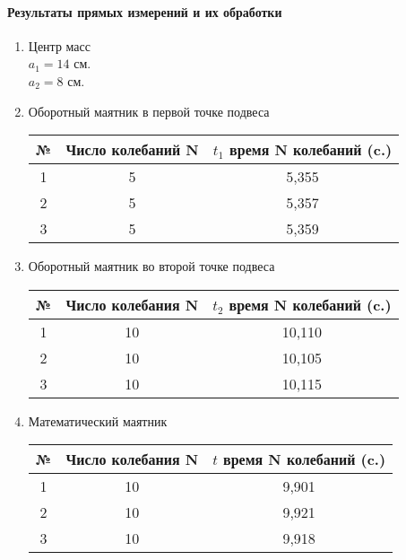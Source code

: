 \documentclass{article}
\begin{document}
\paragraph{Результаты прямых измерений и их обработки }
\begin{enumerate}
	\item Центр масс\\
	$ a_1 = 14 $ см.\\
	$ a_2 = 8$ см.
	
\item Оборотный маятник в первой точке подвеса\\
\begin{table}[!h]	
\begin{tabular}{|c|c|c|}
	\hline
	№ & Число колебаний N & $t_1$  время N колебаний (c.) \\
	\hline
	1 & 5 & 5,355 \\
	\hline
	2 & 5 & 5,357 \\
	\hline
	3 & 5 & 5,359 \\
	\hline
\end{tabular}
\end{table}

\item Оборотный маятник во второй точке подвеса

\begin{table}[!h]
\begin{tabular}{|c|c|c|}
		\hline
		№ & Число колебания N & $t_2$  время N колебаний (c.) \\
		\hline
		1 & 10 & 10,110 \\
		\hline
		2 & 10 & 10,105 \\
		\hline
		3 & 10 & 10,115 \\
		\hline
\end{tabular}
\end{table}

\item Математический маятник

\begin{table}[!hpb]
	\begin{tabular}{|c|c|c|}
		\hline
		№ & Число колебания N & $t$  время N колебаний (c.) \\
		\hline
		1 & 10 &  9,901\\
		\hline
		2 & 10 & 9,921 \\
		\hline
		3 & 10 & 9,918 \\
		\hline
	\end{tabular}
\end{table}
\end{enumerate}
\end{document}
